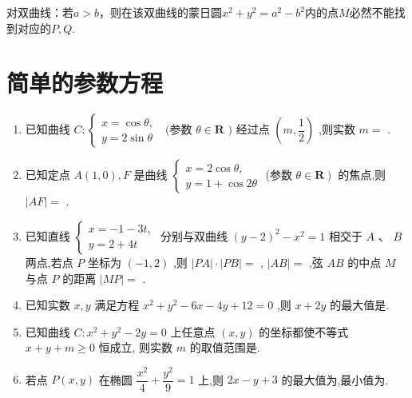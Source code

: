 \begin{enumerate}
\begin{jieda}
        对双曲线：若$a>b$，则在该双曲线的蒙日圆$x^2+y^2 = a^2-b^2$内的点$M$必然不能找到对应的$P,Q$.
    \end{jieda}
\end{enumerate}
\section*{简单的参数方程}

\begin{enumerate}
    \item 已知曲线 $C : \left\{  {\begin{array}{l} x = \cos \theta , \\  y = 2\sin \theta  \end{array}\;\text{ (参数 }\theta  \in  \mathbf{R}\text{ ) 经过点 }\left( {m,\dfrac{1}{2}}\right) }\right.$ ,则实数 $m =$ .
    
    \item 已知定点 $A\left( {1,0}\right) ,F$ 是曲线 $\left\{  \begin{array}{l} x = 2\cos \theta , \\  y = 1 + \cos {2\theta } \end{array}\right.$ (参数 $\left. {\theta  \in  \mathbf{R}}\right)$ 的焦点,则 $\left| {AF}\right|  =$ .

    \item 已知直线 $\left\{  \begin{array}{l} x =  - 1 - {3t}, \\  y = 2 + {4t} \end{array}\right.$ 分别与双曲线 ${\left( y - 2\right) }^{2} - {x}^{2} = 1$ 相交于 $A\text{ 、 }B$ 两点,若点 $P$ 坐标为 $\left( {-1,2}\right)$ ,则 $\left| {PA}\right|  \cdot  \left| {PB}\right|  =$ , $\left| {AB}\right|  =$ ,弦 ${AB}$ 的中点 $M$ 与点 $P$ 的距离 $\left| {MP}\right|  =$ .

    \item 已知实数 $x,y$ 满足方程 ${x}^{2} + {y}^{2} - {6x} - {4y} + {12} = 0$ ,则 $x + {2y}$ 的最大值是.

    \item 已知曲线 $C : {x}^{2} + {y}^{2} - {2y} = 0$ 上任意点 $\left( {x,y}\right)$ 的坐标都使不等式 $x + y + m \geq  0$ 恒成立, 则实数 $m$ 的取值范围是\blkda[2]{$[\sqrt{2}-1, +\infty)$}.

    \item 若点 $P\left( {x,y}\right)$ 在椭圆 $\dfrac{{x}^{2}}{4} + \dfrac{{y}^{2}}{9} = 1$ 上,则 ${2x} - y + 3$ 的最大值为,最小值为.


\end{enumerate}
